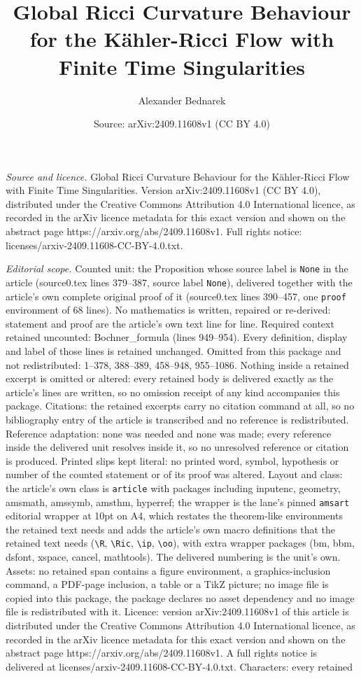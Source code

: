 \documentclass[10pt,a4paper]{amsart}
\title[Global Ricci Curvature Behaviour for the K\"ahler-Ricci Flow]{Global Ricci Curvature Behaviour for the K\"ahler-Ricci Flow with Finite Time Singularities}
\author{Alexander Bednarek}
\date{Source: arXiv:2409.11608v1 (CC BY 4.0)}
\begin{document}
\maketitle

\noindent\emph{Source and licence.} Global Ricci Curvature Behaviour for the K\"ahler-Ricci Flow with Finite Time Singularities. Version arXiv:2409.11608v1 (CC BY 4.0), distributed under the Creative Commons Attribution 4.0 International licence, as recorded in the arXiv licence metadata for this exact version and shown on the abstract page https://arxiv.org/abs/2409.11608v1. Full rights notice: licenses/arxiv-2409.11608-CC-BY-4.0.txt.\par\smallskip

\noindent\textit{Editorial scope.} Counted unit: the Proposition whose source label is \texttt{None} in the article (source0.tex lines 379--387, source label \texttt{None}), delivered together with the article's own complete original proof of it (source0.tex lines 390--457, one \texttt{proof} environment of 68 lines). No mathematics is written, repaired or re-derived: statement and proof are the article's own text line for line. Required context retained uncounted: Bochner\_formula (lines 949--954). Every definition, display and label of those lines is retained unchanged. Omitted from this package and not redistributed: 1--378, 388--389, 458--948, 955--1086. Nothing inside a retained excerpt is omitted or altered: every retained body is delivered exactly as the article's lines are written, so no omission receipt of any kind accompanies this package. Citations: the retained excerpts carry no citation command at all, so no bibliography entry of the article is transcribed and no reference is redistributed. Reference adaptation: none was needed and none was made; every reference inside the delivered unit resolves inside it, so no unresolved reference or citation is produced. Printed slips kept literal: no printed word, symbol, hypothesis or number of the counted statement or of its proof was altered. Layout and class: the article's own class is \texttt{article} with packages including inputenc, geometry, amsmath, amssymb, amsthm, hyperref; the wrapper is the lane's pinned \texttt{amsart} editorial wrapper at 10pt on A4, which restates the theorem-like environments the retained text needs and adds the article's own macro definitions that the retained text needs (\texttt{\textbackslash R}, \texttt{\textbackslash Ric}, \texttt{\textbackslash ip}, \texttt{\textbackslash oo}), with extra wrapper packages (bm, bbm, dsfont, xspace, cancel, mathtools). The delivered numbering is the unit's own. Assets: no retained span contains a figure environment, a graphics-inclusion command, a PDF-page inclusion, a table or a TikZ picture; no image file is copied into this package, the package declares no asset dependency and no image file is redistributed with it. Licence: version arXiv:2409.11608v1 of this article is distributed under the Creative Commons Attribution 4.0 International licence, as recorded in the arXiv licence metadata for this exact version and shown on the abstract page https://arxiv.org/abs/2409.11608v1. A full rights notice is delivered at licenses/arxiv-2409.11608-CC-BY-4.0.txt. Characters: every retained 
\end{document}
